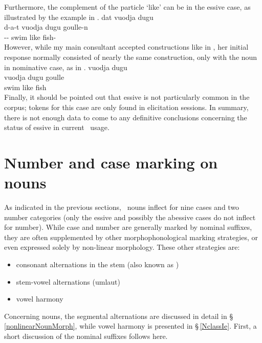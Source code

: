 Furthermore, the complement of the particle  ‘like’ can be in the essive case, as illustrated by the example in . 
\ea\label{ess3}
\glll	dat vuodja dugu \\
	d-a-t vuodja dugu goulle-n\\
	-- swim\BS{} like fish-\\\nopagebreak
{} 
\z
However, while my main consultant accepted constructions like in , her initial response normally consisted of nearly the same construction, only with the noun in nominative case, as in . 
\ea\label{ess4}
\glll	vuodja dugu \\
	vuodja dugu goulle\\
	swim\BS{} like fish\BS{}\\\nopagebreak
{} 
\z
Finally, it should be pointed out that essive is not particularly common in the corpus; tokens for this case are only found in elicitation sessions. In summary, there is not enough data to come to any definitive conclusions concerning the status of essive in current \PS\ usage. 


\section{Number and case marking on nouns}\label{NumCaseNouns}
As indicated in the previous sections, \PS\ nouns inflect for nine cases and two number categories (only the essive and possibly the abessive cases do not inflect for number). While case and number are generally marked by nominal suffixes, they are often supplemented by other morphophonological marking strategies, or even expressed solely by non-linear morphology. These other strategies are: 
\begin{itemize}
\item{consonant alternations in the stem (also known as )}
\item{stem-vowel alternations (umlaut)}
\item{vowel harmony}
\end{itemize} %
Concerning nouns, the segmental alternations are discussed in detail in §\,\ref{nonlinearNounMorph}, while vowel harmony is presented in §\,\ref{NclassIe}. First, a short discussion of the nominal suffixes follows here.


